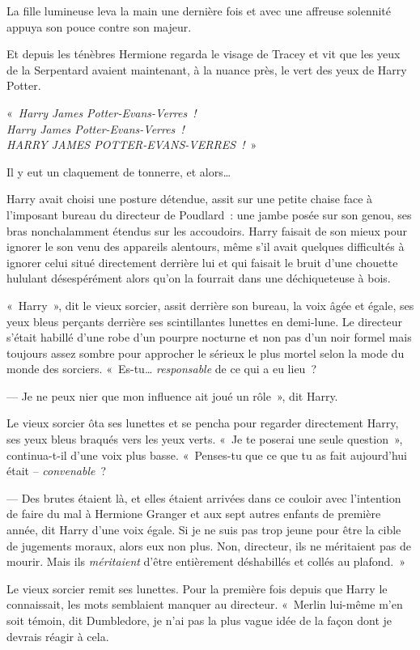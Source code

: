 La fille lumineuse leva la main une dernière fois et avec une affreuse solennité appuya son pouce contre son majeur.

Et depuis les ténèbres Hermione regarda le visage de Tracey et vit que les yeux de la Serpentard avaient maintenant, à la nuance près, le vert des yeux de Harry Potter.

«~\emph{Harry James Potter-Evans-Verres~!\\
Harry James Potter-Evans-Verres~!\\
HARRY JAMES POTTER-EVANS-VERRES~!}~»

Il y eut un claquement de tonnerre, et alors…

\later

Harry avait choisi une posture détendue, assit sur une petite chaise face à l'imposant bureau du directeur de Poudlard~: une jambe posée sur son genou, ses bras nonchalamment étendus sur les accoudoirs.
Harry faisait de son mieux pour ignorer le son venu des appareils alentours, même s'il avait quelques difficultés à ignorer celui situé directement derrière lui et qui faisait le bruit d'une chouette hululant désespérément alors qu'on la fourrait dans une déchiqueteuse à bois.

«~Harry~», dit le vieux sorcier, assit derrière son bureau, la voix âgée et égale, ses yeux bleus perçants derrière ses scintillantes lunettes en demi-lune.
Le directeur s'était habillé d'une robe d'un pourpre nocturne et non pas d'un noir formel mais toujours assez sombre pour approcher le sérieux le plus mortel selon la mode du monde des sorciers.
«~Es-tu…
\emph{responsable} de ce qui a eu lieu~?

--- Je ne peux nier que mon influence ait joué un rôle~», dit Harry.

Le vieux sorcier ôta ses lunettes et se pencha pour regarder directement Harry, ses yeux bleus braqués vers les yeux verts.
«~Je te poserai une seule question~», continua-t-il d'une voix plus basse.
«~Penses-tu que ce que tu as fait aujourd'hui était -- \emph{convenable}~?

--- Des brutes étaient là, et elles étaient arrivées dans ce couloir avec l'intention de faire du mal à Hermione Granger et aux sept autres enfants de première année, dit Harry d'une voix égale.
Si je ne suis pas trop jeune pour être la cible de jugements moraux, alors eux non plus.
Non, directeur, ils ne méritaient pas de mourir.
Mais ils \emph{méritaient} d'être entièrement déshabillés et collés au plafond.~»

Le vieux sorcier remit ses lunettes.
Pour la première fois depuis que Harry le connaissait, les mots semblaient manquer au directeur.
«~Merlin lui-même m'en soit témoin, dit Dumbledore, je n'ai pas la plus vague idée de la façon dont je devrais réagir à cela.

